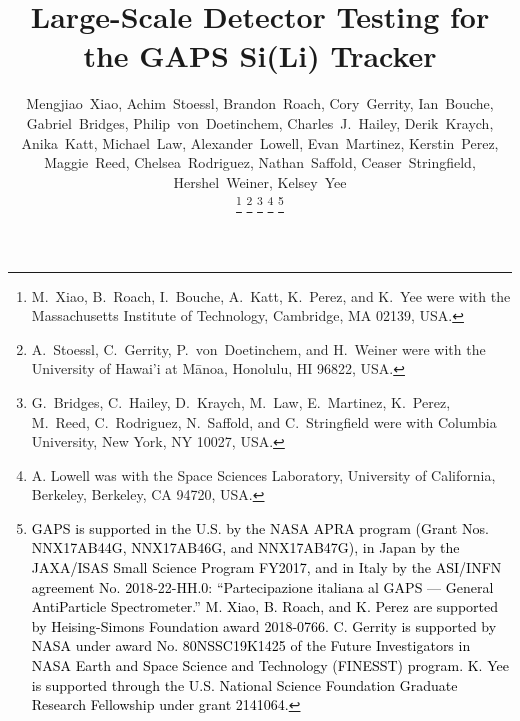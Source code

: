 \documentclass[journal]{IEEEtran}
\newcommand{\red}[1]{\textcolor{black}{#1}}
\begin{document}
%
\title{Large-Scale Detector Testing for the GAPS Si(Li) Tracker}
%
%
%

\author{Mengjiao~Xiao,
        Achim~Stoessl,
        Brandon~Roach,
        Cory~Gerrity,
        Ian~Bouche,
        Gabriel~Bridges,
        Philip~von~Doetinchem,
        Charles~J.~Hailey,
        Derik~Kraych,
        Anika~Katt,
        Michael~Law,
        Alexander~Lowell,
        Evan~Martinez,
        Kerstin~Perez,
        Maggie~Reed,
        Chelsea~Rodriguez,
        Nathan~Saffold,
        Ceaser~Stringfield,
        Hershel~Weiner,
        Kelsey~Yee
        
      
        

\thanks{M.~Xiao, B.~Roach, I.~Bouche, A.~Katt, K.~Perez, and K.~Yee were with the Massachusetts Institute of Technology, Cambridge, MA 02139, USA.}%
\thanks{A.~Stoessl, C.~Gerrity, P.~von~Doetinchem, and H.~Weiner were with the University of Hawai'i at M{\=a}noa, Honolulu, HI 96822, USA.} 
\thanks{G.~Bridges, C.~Hailey, D.~Kraych,  M.~Law, E.~Martinez, K.~Perez, M.~Reed, C.~Rodriguez, N.~Saffold, and C.~Stringfield were with Columbia University, New York, NY 10027, USA.} 
\thanks{A. Lowell was with the Space Sciences Laboratory, University of California, Berkeley, Berkeley, CA 94720, USA.}
\thanks{\red{GAPS is supported in the U.S. by the NASA APRA program (Grant Nos. NNX17AB44G,
NNX17AB46G, and NNX17AB47G), in Japan by the
JAXA/ISAS Small Science Program FY2017, and in Italy
by the ASI/INFN
agreement No. 2018-22-HH.0: ``Partecipazione italiana al
GAPS --- General AntiParticle Spectrometer.'' M. Xiao, B. Roach, and K. Perez are supported by Heising-Simons Foundation award 2018-0766. C. Gerrity is supported by NASA under
award No. 80NSSC19K1425 of the Future Investigators in NASA Earth and Space Science and Technology (FINESST) program. K. Yee is supported through the U.S. National Science Foundation Graduate Research Fellowship under grant 2141064.}}
}
\end{document}
